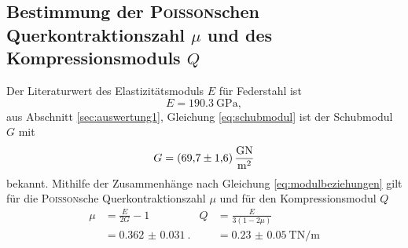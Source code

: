 \subsection{Bestimmung der \texorpdfstring{\textsc{Poisson}schen Querkontraktionszahl $\mu$}{Poissonschen Querkontraktionszahl} und des Kompressionsmoduls \texorpdfstring{$Q$}{Q}}
\label{sec:auswertung4}
Der Literaturwert des Elastizitätsmoduls $E$ für Federstahl ist
\begin{equation}
	E = \SI{190,3}{\giga\pascal},
\end{equation}
aus Abschnitt \ref{sec:auswertung1}, Gleichung \eqref{eq:schubmodul} ist der Schubmodul $G$ mit
\begin{equation}
	G=	\SI{69.7\pm1.6}{\giga\newton\per\meter\squared}
\end{equation}
bekannt.
Mithilfe der Zusammenhänge nach Gleichung \eqref{eq:modulbeziehungen} gilt für die \textsc{Poisson}sche Querkontraktionszahl $\mu$ und für den Kompressionsmodul $Q$
\begin{align}
	\mu &= \frac{E}{2G}-1 & Q 	&= \frac{E}{3(1-2\mu)}\\
		&= \SI{0.362(31)}{}.& &= \SI{0.23(5)}{\tera\newton\per\meter}
	\label{eq:mu}
\end{align}
